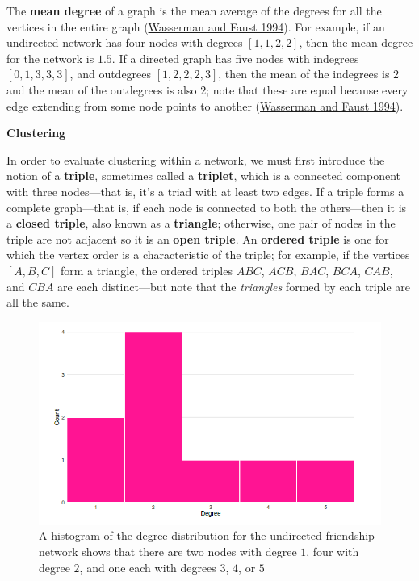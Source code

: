 \documentclass{book}
\begin{document}
The \textbf{mean degree} of a graph is the mean average of the degrees for all
the vertices in the entire graph
(\protect\hyperlink{ref-WassermanFaust1994}{Wasserman and Faust 1994}). For
example, if an undirected network has four nodes with degrees
\([1, 1, 2, 2]\), then the mean degree for the network is \(1.5\). If a
directed graph has five nodes with indegrees \([0, 1, 3, 3, 3]\), and
outdegrees \([1, 2, 2, 2, 3]\), then the mean of the indegrees is \(2\) and
the mean of the outdegrees is also \(2\); note that these are equal because
every edge extending from some node points to another
(\protect\hyperlink{ref-WassermanFaust1994}{Wasserman and Faust 1994}).

\textbf{Clustering}

In order to evaluate clustering within a network, we must first introduce the
notion of a \textbf{triple}, sometimes called a \textbf{triplet}, which is a
connected component with three nodes---that is, it's a triad with at least two
edges. If a triple forms a complete graph---that is, if each node is connected
to both the others---then it is a \textbf{closed triple}, also known as a
\textbf{triangle}; otherwise, one pair of nodes in the triple are not adjacent
so it is an \textbf{open triple}. An \textbf{ordered triple} is one for which
the vertex order is a characteristic of the triple; for example, if the
vertices \([A, B, C]\) form a triangle, the ordered triples \(ABC\), \(ACB\),
\(BAC\), \(BCA\), \(CAB\), and \(CBA\) are each distinct---but note that the
\emph{triangles} formed by each triple are all the same.

\begin{figure}
\centering
\includegraphics{images/social-networks/11-9.png}
\caption{A histogram of the degree distribution for the undirected friendship
network shows that there are two nodes with degree \(1\), four with degree
\(2\), and one each with degrees \(3\), \(4\), or \(5\)}
\end{figure}
\end{document}
